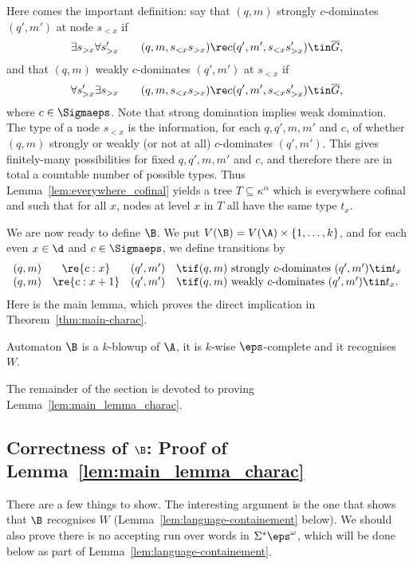 Here comes the important definition: say that $(q,m)$ strongly $c$-dominates $(q',m')$ at node $s_{< x}$ if
\[
    \exists s_{> x} \forall s'_{> x} \qquad (q,m,s_{< x} s_{> x}) \re c (q',m',s_{< x} s'_{> x}) \tin \overline{G},
\]
and that $(q,m)$ weakly $c$-dominates $(q',m')$ at $s_{< x}$ if
\[
    \forall s'_{> x} \exists s_{> x} \qquad (q,m,s_{< x} s_{> x}) \re c (q',m',s_{< x} s'_{> x}) \tin \overline{G},
\]
where $c \in \Sigmaeps$.
Note that strong domination implies weak domination.
The type of a node $s_{< x}$ is the information, for each $q,q',m,m'$ and $c$, of whether $(q,m)$ strongly or weakly (or not at all) $c$-dominates $(q',m')$.
This gives finitely-many possibilities for fixed $q,q',m,m'$ and $c$, and therefore there are in total a countable number of possible types.
Thus Lemma~\ref{lem:everywhere_cofinal} yields a tree $T \subseteq \kappa^{\alpha}$ which is everywhere cofinal and such that for all $x$, nodes at level $x$ in $T$ all have the same type $t_x$.

We are now ready to define $\B$.
We put $V(\B) = V(\A) \times \{1,\dots,k\}$, and for each even $x \in \d$ and $c \in \Sigmaeps$, we define transitions by
\[
    \begin{array}{lcrl}
    (q,m) &\re{c:x}& (q',m') & \tif (q,m) \text{ strongly $c$-dominates } (q',m') \tin t_x \\
    (q,m) &\re{c:x+1}& (q',m') & \tif (q,m) \text{ weakly $c$-dominates } (q',m')\tin t_x.
    \end{array}
\]
Here is the main lemma, which proves the direct implication in Theorem~\ref{thm:main-charac}.

\begin{lemma}\label{lem:main_lemma_charac}
Automaton $\B$ is a $k$-blowup of $\A$, it is $k$-wise $\eps$-complete and it recognises $W$.
\end{lemma}
The remainder of the section is devoted to proving Lemma~\ref{lem:main_lemma_charac}.

\subsection{Correctness of $\B$: Proof of Lemma~\ref{lem:main_lemma_charac}}

There are a few things to show.
The interesting argument is the one that shows that $\B$ recognises $W$ (Lemma~\ref{lem:language-containement} below).
We should also prove there is no accepting run over words in $\Sigma^*\eps^\omega$, which will be done below as part of Lemma~\ref{lem:language-containement}.

